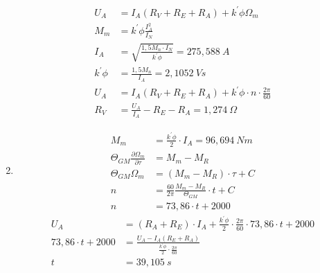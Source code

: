 \begin{solution}
\begin{enumerate}
\begin{align}
	U_A &= I_A ( R_V +R_E +R_A) +k^{'} \phi \Omega_m\\
	M_m &= k^{'} \phi \frac{I_A^2}{I_N}\\
	I_A &= \sqrt{\frac{1,5 M_n \cdot I_N}{k^{'} \phi}} = 275,588~A\\
	k^{'} \phi &= \frac{1,5 M_n}{I_A} = 2,1052~Vs\\
	U_A &= I_A (R_V +R_E +R_A) + k^{'} \phi \cdot n \cdot \frac{2 \pi}{60}\\
	R_V&= \frac{U_A}{I_A} -R_E -R_A= 1,274~\Omega
\end{align}
\item 
\begin{align}
	M_m &= \frac{k^{'} \phi}{2} \cdot I_A = 96,694~Nm\\
	\Theta_{GM} \frac{\partial \Omega_m}{\partial \tau} &= M_m -M_R\\
	\Theta_{GM} \Omega_m &= (M_m -M_R)\cdot \tau + C\\
	n&= \frac{60}{2\pi} \frac{M_m -M_R}{\Theta_{GM}}\cdot t + C\\
	n&= 73,86 \cdot t + 2000
\end{align}
\begin{align}
	U_A &= (R_A +R_E) \cdot I_A + \frac{k^{'} \phi}{2} \cdot \frac{2 \pi}{60}\cdot 73,86 \cdot t + 2000\\
	73,86\cdot t + 2000 &= \frac{U_A -I_A (R_E + R_A)}{\frac{k^{'} \phi}{2} \cdot \frac{2 \pi}{60}}\\
	t &= 39,105~s
\end{align}
\end{enumerate}
\end{solution}